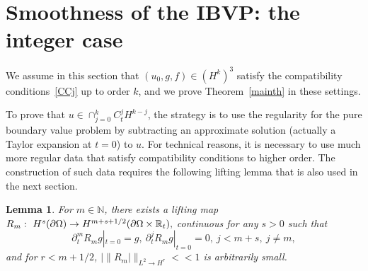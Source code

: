 \documentclass[10pt]{amsart}
\newtheorem{lemm}[theo]{Lemma}\newtheorem{prop}[theo]{Proposition}\newtheorem{coro}[theo]{Corollary}\newtheorem{conj}[theo]{Conjecture}
\theoremstyle{definition}\newtheorem{defi}[theo]{Definition}\newtheorem{rema}[theo]{Remark}\newtheorem{exam}[theo]{Example}\newtheorem{exem}[theo]{Example}\newtheorem{nota}[theo]{Notation}
\newcommand{\R}{\mathbb{R}}
\newcommand{\N}{\mathbb{N}}
\begin{document}
\section{Smoothness of the IBVP: the integer case}\label{sect4}

We assume in this section that $(u_0,g,f)\in (H^k)^3$ satisfy the compatibility conditions~\eqref{CCj} up to order $k$, and we prove Theorem~\ref{mainth} in these settings.


To prove that $u\in \cap_{j=0}^k C_t^jH^{k-j}$, the strategy is to use the regularity for the pure boundary value problem by subtracting an approximate solution (actually a Taylor expansion at $t=0$) to $u$. For technical reasons, it is necessary to use much more regular data that satisfy compatibility conditions to higher order. The construction of such data requires the following lifting lemma that is also used in the next section.

\begin{lemm}\label{releve}
For $m\in \N$, there exists a lifting map $R_m:\ H^{s}(\partial\Omega)\to H^{m+s+1/2}\linebreak(\partial\Omega\times \R_t),$ continuous for any $s>0$ such that
\begin{equation}\label{trace}
\partial_t^{m}R_mg|_{t=0}=g,\ \partial_t^jR_mg|_{t=0}=0,\ j<m+s,
\ j\neq m,
\end{equation}
and for $r<m+1/2$, $|\|R_m|\|_{L^2\to H^r}<<1$ is arbitrarily small.
\end{lemm}
\end{document}
